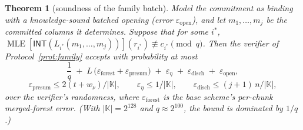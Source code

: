 \documentclass[11pt]{article}
\newcommand{\K}{\mathbb{K}}            %
\newcommand{\INT}{\mathsf{INT}}
\DeclareMathOperator{\MLE}{MLE}
\theoremstyle{plain}
\newtheorem{theorem}{Theorem}[section]
\theoremstyle{definition}
\theoremstyle{remark}
\begin{document}
\begin{theorem}[soundness of the family batch]\label{thm:sound}
Model the commitment as binding with a knowledge-sound batched opening
(error $\varepsilon_{\mathrm{open}}$), and let $m_1,\dots,m_j$ be the
committed columns it determines. Suppose that for some $i^{\ast}$,
$\MLE[\INT(L_{i^{\ast}}(m_1,\dots,m_j))](r_{i^{\ast}})\not\equiv
c_{i^{\ast}} \pmod q$. Then the verifier of Protocol~\ref{prot:family}
accepts with probability at most
\[
  \frac1q
  \;+\; L\,\bigl(\varepsilon_{\mathrm{forest}}
                +\varepsilon_{\mathrm{presum}}\bigr)
  \;+\; \varepsilon_{\eta}
  \;+\; \varepsilon_{\mathrm{disch}}
  \;+\; \varepsilon_{\mathrm{open}},
\]
\[
    \varepsilon_{\mathrm{presum}} \le 2(t+w_\nu)/|\K|,
    \qquad
    \varepsilon_{\eta} \le 1/|\K|,
    \qquad
    \varepsilon_{\mathrm{disch}} \le (j{+}1)\,n/|\K|,
\]
over the verifier's randomness, where $\varepsilon_{\mathrm{forest}}$ is the
base scheme's per-chunk merged-forest error. (With $|\K|=2^{128}$ and
$q\approx2^{100}$, the bound is dominated by $1/q$.)
\end{theorem}
\end{document}
